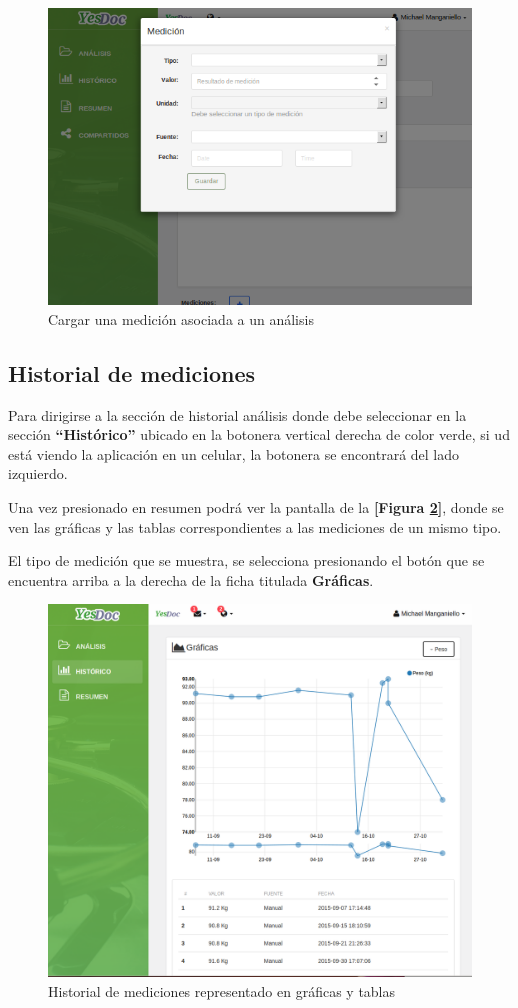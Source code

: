  	\begin{figure}
 		\centering
 		\includegraphics[width=.8\textwidth]{img/manual_de_usuario/mu-cargar_medicion}
 		\caption{Cargar una medición asociada a un análisis}
 		\label{mu-cargar_medicion}	
 	\end{figure}

\subsection{Historial de mediciones}
Para dirigirse a la sección de historial análisis donde debe seleccionar en la sección \textbf{``Histórico''} ubicado en la botonera vertical derecha de color verde, si ud está viendo la aplicación en un celular, la botonera se encontrará del lado izquierdo.

Una vez presionado en resumen podrá ver la pantalla de la \textbf{[Figura \ref{mu-historico}]}, donde se ven las gráficas y las tablas correspondientes a las mediciones de un mismo tipo.

El tipo de medición que se muestra, se selecciona presionando el botón que se encuentra arriba a la derecha de la ficha titulada \textbf{Gráficas}.

\begin{figure}
	\centering
	\includegraphics[width=.8\textwidth]{img/manual_de_usuario/historico}
	\caption{Historial de mediciones representado en gráficas y tablas}
	\label{mu-historico}
\end{figure}

